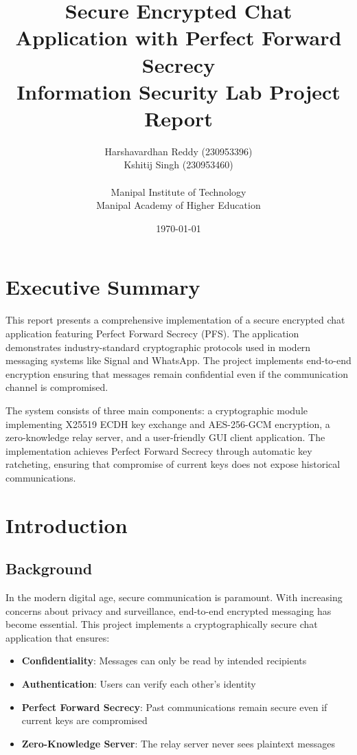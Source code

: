 \documentclass[12pt,a4paper]{article}
\title{
    \textbf{Secure Encrypted Chat Application with Perfect Forward Secrecy}\\
    \large Information Security Lab Project Report
}
\author{
    Harshavardhan Reddy (230953396)\\
    Kshitij Singh (230953460)\\
    \\
    Manipal Institute of Technology\\
    Manipal Academy of Higher Education
}
\date{\today}
\begin{document}
\maketitle
\thispagestyle{empty}
\newpage

\tableofcontents
\newpage

\section{Executive Summary}

This report presents a comprehensive implementation of a secure encrypted chat application featuring Perfect Forward Secrecy (PFS). The application demonstrates industry-standard cryptographic protocols used in modern messaging systems like Signal and WhatsApp. The project implements end-to-end encryption ensuring that messages remain confidential even if the communication channel is compromised.

The system consists of three main components: a cryptographic module implementing X25519 ECDH key exchange and AES-256-GCM encryption, a zero-knowledge relay server, and a user-friendly GUI client application. The implementation achieves Perfect Forward Secrecy through automatic key ratcheting, ensuring that compromise of current keys does not expose historical communications.

\section{Introduction}

\subsection{Background}

In the modern digital age, secure communication is paramount. With increasing concerns about privacy and surveillance, end-to-end encrypted messaging has become essential. This project implements a cryptographically secure chat application that ensures:

\begin{itemize}
    \item \textbf{Confidentiality}: Messages can only be read by intended recipients
    \item \textbf{Authentication}: Users can verify each other's identity
    \item \textbf{Perfect Forward Secrecy}: Past communications remain secure even if current keys are compromised
    \item \textbf{Zero-Knowledge Server}: The relay server never sees plaintext messages
\end{itemize}
\end{document}
